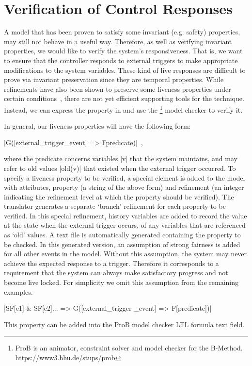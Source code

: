 

\section{Verification of Control Responses}
\label{sec:verificationResponses}
A model that has been proven to satisfy some invariant (e.g. safety) properties, may still not behave in a useful way.
Therefore, as well as verifying invariant properties, we would like to verify the system's responsiveness.  
That is, we want to ensure that the controller responds to external triggers to make appropriate modifications to the system variables. 
These kind of live responses are difficult to prove via invariant preservation since they are temporal properties. 
While \EventB refinements have also been shown to preserve some liveness properties under certain conditions~\cite{hoang2016ltl}, there are not yet efficient supporting tools for the technique.
Instead, we can express the property in \LTL  and use the \PROB\footnote{ProB is an animator, constraint solver and model checker for the B-Method. https://www3.hhu.de/stups/prob} model checker to verify it.

In general, our liveness properties will have the following form:
\begin{center}
  |G([external_trigger_event] => F{predicate})|~,
\end{center}
where the predicate concerns variables |v| that the system maintains, and may refer to old values |old(v)| that existed when the external trigger occurred.
To specify a liveness property to be verified, a special \LTL element is added to the \SCXML model with attributes, property (a string of the above form)  and refinement (an integer indicating the refinement level at which the property should be verified).
The translator generates a separate `branch' refinement for each \LTL property to be verified. 
In this special refinement, history variables are added to record the value at the state when the external trigger occurs, of any variables that are referenced as `old' values.
A text file is automatically generated containing the \LTL property to be checked. 
In this generated version, an assumption of strong fairness is added for all other events in the model.
Without this assumption, the system may never achieve the expected response to a trigger. 
Therefore it corresponds to a requirement that the system can always make satisfactory progress and not become live locked.
For simplicity we omit this assumption from the remaining examples.
\begin{center}
  |SF[e1] & SF[e2]... => G([external_trigger _event] => F[predicate])|
\end{center}
This property can be added into the ProB model checker LTL formula text field.

